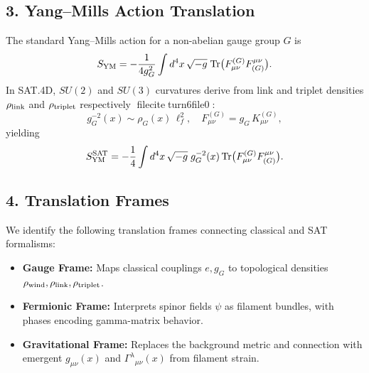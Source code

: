 \subsection*{3. Yang–Mills Action Translation}
The standard Yang–Mills action for a non-abelian gauge group \(G\) is
\[
S_{\rm YM} 
= -\frac{1}{4g_G^2}\int d^4x\,\sqrt{-g}\;
\mathrm{Tr}\bigl(F_{\mu\nu}^{(G)}F^{\mu\nu}_{(G)}\bigr).
\]
In SAT.4D, \(SU(2)\) and \(SU(3)\) curvatures derive from link and triplet densities
\(\rho_{\rm link}\) and \(\rho_{\rm triplet}\) respectively fileciteturn6file0:
\[
g_G^{-2}(x)\sim \rho_G(x)\,\ell_f^2,
\quad
F_{\mu\nu}^{(G)} = g_G\,K_{\mu\nu}^{(G)},
\]
yielding
\[
S_{\rm YM}^{\rm SAT}
= -\frac{1}{4}\int d^4x\,\sqrt{-g}\;g_G^{-2}(x)\,
\mathrm{Tr}\bigl(F_{\mu\nu}^{(G)}F^{\mu\nu}_{(G)}\bigr).
\]

\subsection*{4. Translation Frames}
We identify the following translation frames connecting classical and SAT formalisms:
\begin{itemize}
  \item \textbf{Gauge Frame:} Maps classical couplings \(e, g_G\) to topological densities
    \(\rho_{\rm wind}, \rho_{\rm link}, \rho_{\rm triplet}\).
  \item \textbf{Fermionic Frame:} Interprets spinor fields \(\psi\) as filament bundles,
    with phases encoding gamma-matrix behavior.
  \item \textbf{Gravitational Frame:} Replaces the background metric and connection with
    emergent \(g_{\mu\nu}(x)\) and \(\Gamma^\lambda{}_{\mu\nu}(x)\) from filament strain.
\end{itemize}
